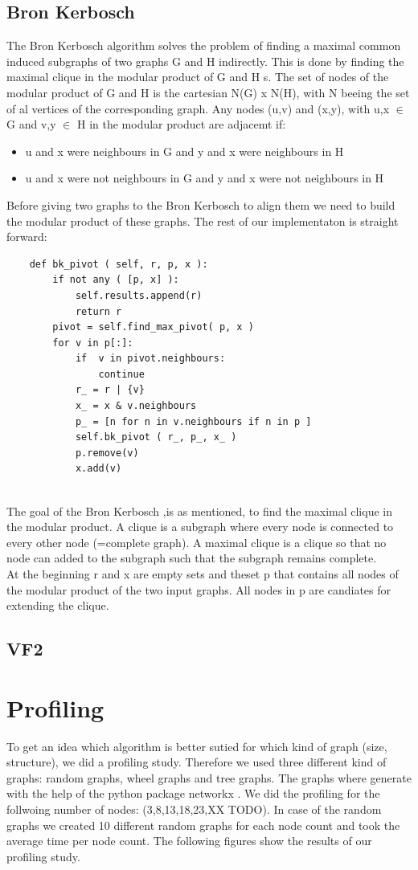 \documentclass{SeminarV2}
\begin{document}
\subsection{Bron Kerbosch}
The Bron Kerbosch algorithm solves the problem of finding a maximal common induced subgraphs of two graphs G and H indirectly. This is done by finding the maximal clique in the modular product of G and H s. The set of nodes of the modular product of G and H  is the cartesian N(G) x N(H), with N beeing the set of al vertices of the corresponding graph. Any nodes (u,v) and (x,y), with u,x $\in$ G and v,y $\in$ H in the modular product are adjacemt if:
\begin{itemize}
  \item u and x were neighbours in G and y and x were neighbours in H
  \item u and x were not neighbours in G and y and x were not neighbours in H
\end{itemize}
Before giving two graphs to the Bron Kerbosch to align them we need to build the modular product of these graphs. The rest of our implementaton is straight forward:
\begin{verbatim}
    def bk_pivot ( self, r, p, x ):
        if not any ( [p, x] ):
            self.results.append(r)
            return r
        pivot = self.find_max_pivot( p, x )
        for v in p[:]:
            if  v in pivot.neighbours:
                continue
            r_ = r | {v}
            x_ = x & v.neighbours
            p_ = [n for n in v.neighbours if n in p ]
            self.bk_pivot ( r_, p_, x_ )
            p.remove(v)
            x.add(v)


\end{verbatim}
The goal of the Bron Kerbosch ,is as mentioned, to find the maximal clique in the modular product. A clique is a subgraph where every node is connected to every other node (=complete graph). A maximal clique is a clique so that no node can added to the subgraph such that the subgraph remains complete.\\
At the beginning r and x are empty sets and theset p that contains all nodes of the modular product of the two input graphs. All nodes in p are candiates for extending the clique.

\subsection{VF2}
\section{Profiling}
To get an idea which algorithm is better sutied for which kind of graph (size, structure),
we did a profiling study. Therefore we used three different kind of graphs:
random graphs, wheel graphs and tree graphs. The graphs where generate with the help of
the python package networkx \cite{}. We did the profiling for the follwoing number of nodes:
(3,8,13,18,23,XX TODO).
In case of the random graphs we created 10 different random graphs for each node count and took the average time per node count. The following figures show the results of our profiling study.
\end{document}
